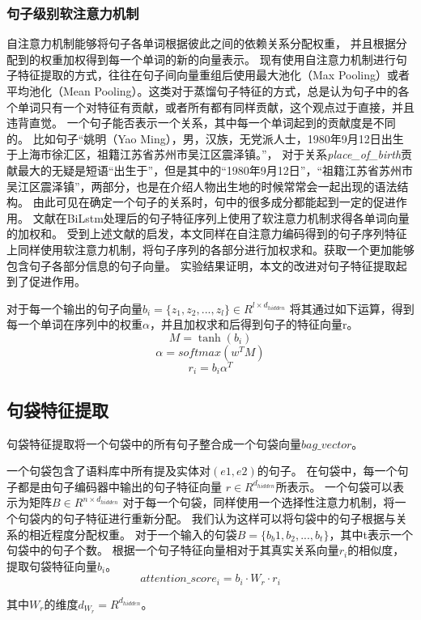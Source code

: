\documentclass[UTF8]{csoarticle}
\begin{document}
\subsubsection{句子级别软注意力机制}
自注意力机制能够将句子各单词根据彼此之间的依赖关系分配权重，
并且根据分配到的权重加权得到每一个单词的新的向量表示。
现有使用自注意力机制进行句子特征提取的方式，往往在句子间向量重组后使用最大池化（Max Pooling）或者平均池化（Mean Pooling）。这类对于蒸馏句子特征的方式，总是认为句子中的各个单词只有一个对特征有贡献，或者所有都有同样贡献，这个观点过于直接，并且违背直觉。
一个句子能否表示一个关系，其中每一个单词起到的贡献度是不同的。
比如句子“姚明（Yao Ming），男，汉族，无党派人士，1980年9月12日出生于上海市徐汇区，祖籍江苏省苏州市吴江区震泽镇。”，
对于关系\textit{place\_of\_birth}贡献最大的无疑是短语“出生于”，但是其中的“1980年9月12日”，“祖籍江苏省苏州市吴江区震泽镇”，两部分，也是在介绍人物出生地的时候常常会一起出现的语法结构。
由此可见在确定一个句子的关系时，句中的很多成分都能起到一定的促进作用。
文献\cite{bib5}在BiLstm处理后的句子特征序列上使用了软注意力机制求得各单词向量的加权和。
受到上述文献的启发，本文同样在自注意力编码得到的句子序列特征上同样使用软注意力机制，将句子序列的各部分进行加权求和。获取一个更加能够包含句子各部分信息的句子向量。
实验结果证明，本文的改进对句子特征提取起到了促进作用。

对于每一个输出的句子向量$ b_i = \{z_1, z_2,...,z_l\} \in R^{l \times d_{hidden}} $
将其通过如下运算，得到每一个单词在序列中的权重$\alpha$，并且加权求和后得到句子的特征向量r。
\[ M= \tanh(b_i) \]
\[ \alpha = softmax(w^T M) \]
\[ r_i = b_i \alpha^T \]

\subsection{句袋特征提取}
句袋特征提取将一个句袋中的所有句子整合成一个句袋向量$bag\_vector$。

一个句袋包含了语料库中所有提及实体对$(e1, e2)$的句子。
在句袋中，每一个句子都是由句子编码器中输出的句子特征向量 $r \in R^{d_{hidden}}$所表示。
一个句袋可以表示为矩阵$B \in R^{n \times d_{hidden}}$
对于每一个句袋，同样使用一个选择性注意力机制，将一个句袋内的句子特征进行重新分配。
我们认为这样可以将句袋中的句子根据与关系的相近程度分配权重。
对于一个输入的句袋$B = \{b_b1, b_2,...,b_t\}$，其中t表示一个句袋中的句子个数。
根据一个句子特征向量相对于其真实关系向量$r_i$的相似度，提取句袋特征向量$b_i$。
\[attention\_score_i =  b_i\cdot W_r \cdot r_i\]

其中$W_r$的维度$d_{W_r} = R^{d_{hidden}}$。
\end{document}
